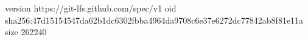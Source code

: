 version https://git-lfs.github.com/spec/v1
oid sha256:47d15154547da62b1dc6302fbba4964da9708c6e37e6272dc77842ab8f81e11a
size 262240
